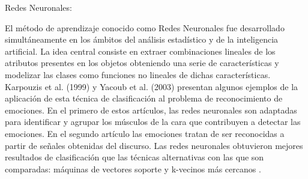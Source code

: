 \begin{enumerate}
{\bf \item Redes Neuronales:} \vskip 0.1cm
El método de aprendizaje conocido como Redes Neuronales fue desarrollado simultáneamente en los ámbitos del análisis estadístico y de la inteligencia artificial. La idea central consiste en extraer combinaciones lineales de los atributos presentes en los objetos obteniendo una serie de características y modelizar las clases como funciones no lineales de dichas características. Karpouzis et al. (1999) y Yacoub et al. (2003) presentan algunos ejemplos de la aplicación de esta técnica de clasificación al problema de reconocimiento de emociones. En el primero de estos artículos, las redes neuronales son adaptadas para identificar y agrupar los músculos de la cara que contribuyen a detectar las emociones. En el segundo artículo las emociones tratan de ser reconocidas a partir de señales obtenidas del discurso. Las redes neuronales obtuvieron mejores resultados de clasificación que las técnicas alternativas con las que son comparadas: máquinas de vectores soporte y k-vecinos más cercanos \citep{Isaac}.


\end{enumerate}
